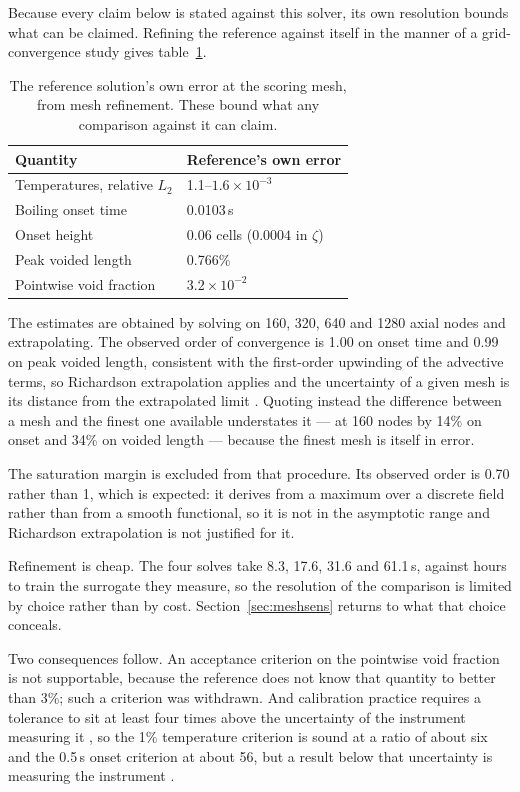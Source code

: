 \documentclass[11pt,a4paper]{article}
\begin{document}
Because every claim below is stated against this solver, its own resolution bounds what can
be claimed. Refining the reference against itself in the manner of a grid-convergence study
\cite{eca} gives table~\ref{tab:ruler}.

\begin{table}[tbp]
\caption{The reference solution's own error at the scoring mesh, from mesh refinement.
These bound what any comparison against it can claim.}
\label{tab:ruler}
\centering
\begin{tabular}{@{}ll@{}}
\toprule
Quantity & Reference's own error \\
\midrule
Temperatures, relative $L_2$ & 1.1--$1.6\times10^{-3}$ \\
Boiling onset time           & 0.0103\,s \\
Onset height                 & 0.06 cells ($0.0004$ in $\zeta$) \\
Peak voided length           & 0.766\% \\
Pointwise void fraction      & $3.2\times10^{-2}$ \\
\bottomrule
\end{tabular}
\end{table}

The estimates are obtained by solving on 160, 320, 640 and 1280 axial nodes and
extrapolating. The observed order of convergence is 1.00 on onset time and 0.99 on peak
voided length, consistent with the first-order upwinding of the advective terms, so
Richardson extrapolation applies and the uncertainty of a given mesh is its distance from
the extrapolated limit \cite{eca}. Quoting instead the difference between a mesh and the
finest one available understates it --- at 160 nodes by 14\% on onset and 34\% on voided
length --- because the finest mesh is itself in error.

The saturation margin is excluded from that procedure. Its observed order is 0.70 rather
than 1, which is expected: it derives from a maximum over a discrete field rather than from
a smooth functional, so it is not in the asymptotic range and Richardson extrapolation is
not justified for it.

Refinement is cheap. The four solves take 8.3, 17.6, 31.6 and 61.1\,s, against hours to
train the surrogate they measure, so the resolution of the comparison is limited by choice
rather than by cost. Section~\ref{sec:meshsens} returns to what that choice conceals.

Two consequences follow. An acceptance criterion on the pointwise void fraction is not
supportable, because the reference does not know that quantity to better than 3\%; such a
criterion was withdrawn. And calibration practice requires a tolerance to sit at least four
times above the uncertainty of the instrument measuring it \cite{nist}, so the 1\%
temperature criterion is sound at a ratio of about six and the 0.5\,s onset criterion at
about 56, but a result below that uncertainty is measuring the instrument
\cite{jakeman}.
\end{document}
